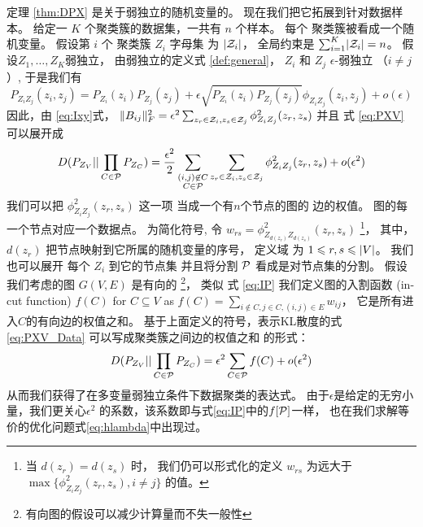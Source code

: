 定理 \ref{thm:DPX} 是关于弱独立的随机变量的。
现在我们把它拓展到针对数据样本。
给定一 $K$ 个聚类簇的数据集，一共有 $n$ 个样本。
每个 聚类簇被看成一个随机变量。
假设第 $i$ 个 聚类簇 $Z_i$ 字母集 为 $\abs{\mathcal{Z}_i}$，
全局约束是 $\sum_{i=1}^K \abs{\mathcal{Z}_i} = n$。
假设$Z_1, \dots, Z_K$弱独立，
由弱独立的定义式 \ref{def:general}， $Z_i$ 和 $Z_j$ $\epsilon$-弱独立 （$i\neq j$）,
于是我们有
\begin{equation}\label{eq:phi_w}
P_{Z_i Z_j}(z_i, z_j) = P_{Z_i}(z_i)P_{Z_j}(z_j) + \epsilon \sqrt{P_{Z_i}(z_i)P_{Z_j}(z_j)} \phi_{Z_i Z_j}(z_i, z_j) + o(\epsilon)
\end{equation}
因此，由 \eqref{eq:Ixy}式，
 $\norm{B_{ij}}_F^2 = \epsilon^2 \sum_{z_r \in \mathcal{Z}_i, z_s \in \mathcal{Z}_j} \phi^2_{Z_i Z_j}(z_r, z_s)$ 
 并且 式 \eqref{eq:PXV} 可以展开成
\begin{equation}\label{eq:PXV_Data}
D(P_{Z_V} || \prod_{C\in \P} P_{Z_{C}}) =
{\epsilon^2\over 2}\sum_{\substack{(i,j) \not\in C\\ C\in \P}}
\sum_{z_r \in \mathcal{Z}_i, z_s \in \mathcal{Z}_j}  \phi^2_{Z_i Z_j}(z_r, z_s) + o(\epsilon^2)
\end{equation}
我们可以把
$\phi^2_{Z_i Z_j}(z_r, z_s)$ 这一项
当成一个有$n$个节点的图的
边的权值。
图的每一个节点对应一个数据点。
为简化符号, 令 $w_{rs} = \phi^2_{Z_{d(z_r)}Z_{d(z_s)}}(z_r, z_s)$
\footnote{当 $d(z_r) = d(z_s)$ 时，
我们仍可以形式化的定义 $w_{rs}$ 为远大于$\max\{\phi^2_{Z_i Z_j}(z_r, z_s), i\neq j\}$
的值。}，
其中，$d(z_r)$ 把节点映射到它所属的随机变量的序号， 定义域 为 $1\leq r,s \leq \abs{V}$。
我们也可以展开 每个 $Z_i$ 到它的节点集 并且将分割 $\P$
看成是对节点集的分割。
假设我们考虑的图 $G(V, E)$ 是有向的
\footnote{有向图的假设可以减少计算量而不失一般性}，
类似 式 \ref{eq:IP} 我们定义图的入割函数 (in-cut function) $f(C)$ for $C\subseteq V$ as $f(C) = \sum_{i\not\in C, j\in C, (i,j) \in E} w_{ij}$，
它是所有进入$C$的有向边的权值之和。
基于上面定义的符号，表示KL散度的式 \eqref{eq:PXV_Data} 可以写成聚类簇之间边的权值之和
的形式：
\begin{equation}\label{eq:PXV_Data_Simplified}
D(P_{Z_V} || \prod_{C\in \P} P_{Z_{C}}) = \epsilon^2 \sum_{C \in \P} f(C)+ o(\epsilon^2)
\end{equation}
从而我们获得了在多变量弱独立条件下数据聚类的表达式。
由于$\epsilon$是给定的无穷小量，我们更关心$\epsilon^2$
的系数，该系数即与式\eqref{eq:IP}中的$f[\P]$一样，
也在我们求解等价的优化问题式\eqref{eq:hlambda}中出现过。

